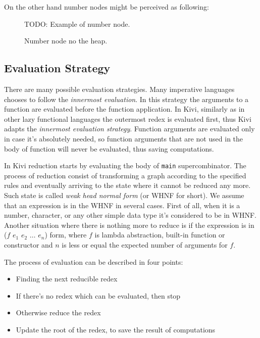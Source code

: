 \documentclass[12pt,a4paper]{report}
\begin{document}
On the other hand number nodes might be perceived as following:

\begin{figure}[h!]
  \centering

  TODO: Example of number node.

  \caption{Number node no the heap.}
  \label{fig:num_node}
\end{figure}

\subsection{Evaluation Strategy}
There are many possible evaluation strategies. Many imperative languages
chooses to follow the \textit{innermost evaluation}. In this strategy the
arguments to a function are evaluated before the function application. In Kivi,
similarly as in other lazy functional languages the outermost redex is
evaluated first, thus Kivi adapts the \textit{innermost evaluation strategy}.
Function arguments are evaluated only in case it's absolutely needed, so
function arguments that are not used in the body of function will never be
evaluated, thus saving computations.

In Kivi reduction starts by evaluating the body of \texttt{main}
supercombinator. The process of reduction consist of transforming a graph
according to the specified rules and eventually arriving to the state where it
cannot be reduced any more. Such state is called \textit{weak head normal form}
(or WHNF for short). We assume that an expression is in the WHNF in several
cases. First of all, when it is a number, character, or any other simple data
type it's considered to be in WHNF. Another situation where there is nothing
more to reduce is if the expression is in ($f$ $e_1$ $e_2$ $\ldots$ $e_n$)
form, where $f$ is lambda abstraction, built-in function or constructor and $n$
is less or equal the expected number of arguments for $f$.

The process of evaluation can be described in four points:

\begin{itemize}
  \item Finding the next reducible redex
  \item If there's no redex which can be evaluated, then stop
  \item Otherwise reduce the redex
  \item Update the root of the redex, to save the result of computations
\end{itemize}
\end{document}
